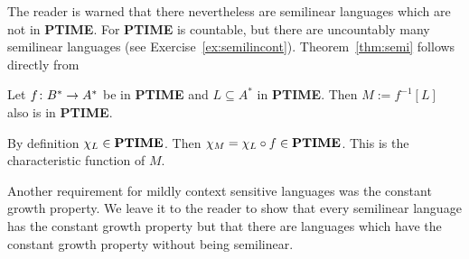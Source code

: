 The reader is warned that there nevertheless are semilinear languages
which are not in {\bf PTIME}. For {\bf PTIME} is countable, but
there are uncountably many semilinear languages (see
Exercise~\ref{ex:semilincont}). Theorem~\ref{thm:semi} follows 
directly from
\begin{thm}
Let $f \colon B^{\ast} \rightarrow A^{\ast}$ be in \textbf{PTIME} and
$L \subseteq A^{\ast}$ in \textbf{PTIME}. Then
$M := f^{-1}[L]$ also is in \textbf{PTIME}.
\end{thm}
\proofbeg
By definition $\chi_L \in \mbox{\bf PTIME}$. Then
$\chi_M = \chi_L \circ f \in \mbox{\bf PTIME}$. This is
the characteristic function of $M$.
\proofend

Another requirement for mildly context sensitive languages
was the constant growth property. We leave it to the reader 
to show that every semilinear language has the constant growth 
property but that there are languages which have the constant 
growth property without being semilinear.

